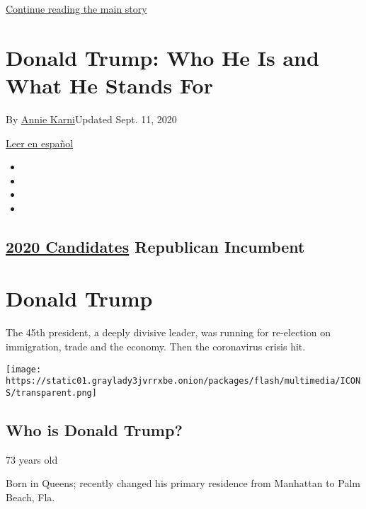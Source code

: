 \protect\hyperlink{after-top}{Continue reading the main story}

\hypertarget{donald-trump-who-he-is-and-what-he-stands-for}{%
\section{Donald Trump: Who He Is and What He Stands
For}\label{donald-trump-who-he-is-and-what-he-stands-for}}

By \href{https://www.nytimes3xbfgragh.onion/by/annie-karni}{Annie
Karni}Updated Sept. 11, 2020

\href{https://www.nytimes3xbfgragh.onion/es/interactive/2020/espanol/estados-unidos/donald-trump-elecciones.html}{Leer
en español}

\begin{itemize}
\item
\item
\item
\item
\end{itemize}

\hypertarget{2020-candidates--republican-incumbent-}{%
\subsection{\texorpdfstring{\href{https://www.nytimes3xbfgragh.onion/interactive/2019/us/politics/2020-presidential-candidates.html}{2020
Candidates} Republican Incumbent
}{2020 Candidates  Republican Incumbent }}\label{2020-candidates--republican-incumbent-}}

\hypertarget{donald-trump}{%
\section{Donald Trump}\label{donald-trump}}

The 45th president, a deeply divisive leader, was running for
re-election on immigration, trade and the economy. Then the coronavirus
crisis hit.

\texttt{[image: https://static01.graylady3jvrrxbe.onion/packages/flash/multimedia/ICONS/transparent.png]}

\hypertarget{who-is-donald-trump}{%
\subsection{Who is Donald Trump?}\label{who-is-donald-trump}}

73 years old

Born in Queens; recently changed his primary residence from Manhattan to
Palm Beach, Fla.

